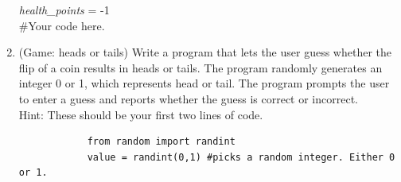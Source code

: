 \documentclass{article}
\begin{document}
\begin{enumerate}
		\vspace*{-6em}
		\textit{health\_points} = -1\\
		\#Your code here.
		\vspace*{3em}		


	\item 
		(Game: heads or tails)  Write a program that lets the user guess whether the flip of a coin 
		results in heads or tails.  The program randomly generates an integer 0 or 1, which 
		represents head or tail.  The program prompts the user to enter a guess and reports whether 
		the guess is correct or incorrect.\\
		Hint: These should be your first two lines of code.
		\begin{verbatim}
		    from random import randint
		    value = randint(0,1) #picks a random integer. Either 0 or 1.
		\end{verbatim}




\end{enumerate}
\end{document}
